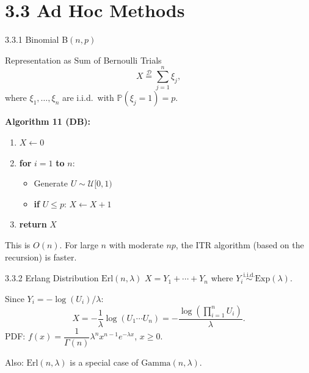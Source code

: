 \documentclass[aspectratio=169,10pt]{beamer}
\newcommand{\PP}{\mathbb{P}}
\newcommand{\UU}{\mathcal{U}}
\begin{document}
\section{3.3 Ad Hoc Methods}

\begin{frame}[allowframebreaks]{3.3.1 Binomial B$(n,p)$}
  \begin{block}{Representation as Sum of Bernoulli Trials}
    \[
      X \stackrel{\mathcal{D}}{=} \sum_{j=1}^{n} \xi_j,
    \]
    where $\xi_1,\ldots,\xi_n$ are i.i.d.\ with $\PP(\xi_j=1)=p$.
  \end{block}

  \textbf{Algorithm 11 (DB):}
  \begin{enumerate}
    \item $X \leftarrow 0$
    \item \textbf{for} $i=1$ \textbf{to} $n$:
    \begin{itemize}
      \item Generate $U\sim\UU[0,1)$
      \item \textbf{if} $U\le p$: $X \leftarrow X+1$
    \end{itemize}
    \item \textbf{return} $X$
  \end{enumerate}

  \medskip
  This is $O(n)$.  For large $n$ with moderate $np$, the ITR algorithm
  (based on the recursion) is faster.

  \framebreak

  \begin{block}{3.3.2 Erlang Distribution $\mathrm{Erl}(n,\lambda)$}
    $X = Y_1 + \cdots + Y_n$ where $Y_i \stackrel{\text{i.i.d.}}{\sim} \mathrm{Exp}(\lambda)$.

    \medskip
    Since $Y_i = -\log(U_i)/\lambda$:
    \[
      X = -\frac{1}{\lambda}\log(U_1\cdots U_n) = -\frac{\log(\prod_{i=1}^n U_i)}{\lambda}.
    \]
    PDF: $f(x) = \dfrac{1}{\Gamma(n)}\lambda^n x^{n-1}e^{-\lambda x}$, $x\ge 0$.
  \end{block}

  Also: $\mathrm{Erl}(n,\lambda)$ is a special case of $\mathrm{Gamma}(n,\lambda)$.
\end{frame}
\end{document}
